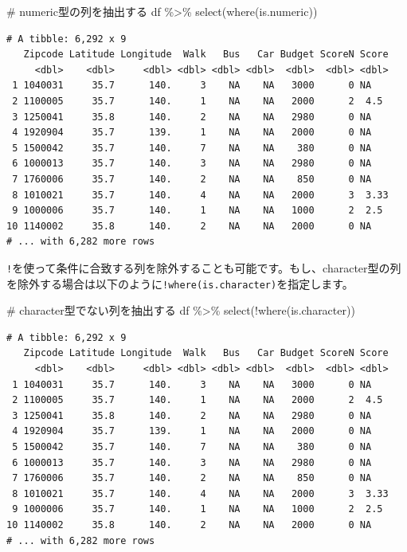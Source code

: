 \documentclass[
  a4paper,
  pandoc,
  ja=standard,
  jafont=haranoaji]{bxjsbook}
\newenvironment{Shaded}{\begin{snugshade}}{\end{snugshade}}
\newcommand{\CommentTok}[1]{\textcolor[rgb]{0.37,0.37,0.37}{#1}}
\newcommand{\FunctionTok}[1]{\textcolor[rgb]{0.28,0.35,0.67}{#1}}
\newcommand{\NormalTok}[1]{\textcolor[rgb]{0.00,0.48,0.65}{#1}}
\newcommand{\SpecialCharTok}[1]{\textcolor[rgb]{0.37,0.37,0.37}{#1}}
\begin{document}
\begin{Shaded}
\begin{Highlighting}[numbers=left,,]
\CommentTok{\# numeric型の列を抽出する}
\NormalTok{df }\SpecialCharTok{\%\textgreater{}\%}
  \FunctionTok{select}\NormalTok{(}\FunctionTok{where}\NormalTok{(is.numeric))}
\end{Highlighting}
\end{Shaded}

\begin{verbatim}
# A tibble: 6,292 x 9
   Zipcode Latitude Longitude  Walk   Bus   Car Budget ScoreN Score
     <dbl>    <dbl>     <dbl> <dbl> <dbl> <dbl>  <dbl>  <dbl> <dbl>
 1 1040031     35.7      140.     3    NA    NA   3000      0 NA   
 2 1100005     35.7      140.     1    NA    NA   2000      2  4.5 
 3 1250041     35.8      140.     2    NA    NA   2980      0 NA   
 4 1920904     35.7      139.     1    NA    NA   2000      0 NA   
 5 1500042     35.7      140.     7    NA    NA    380      0 NA   
 6 1000013     35.7      140.     3    NA    NA   2980      0 NA   
 7 1760006     35.7      140.     2    NA    NA    850      0 NA   
 8 1010021     35.7      140.     4    NA    NA   2000      3  3.33
 9 1000006     35.7      140.     1    NA    NA   1000      2  2.5 
10 1140002     35.8      140.     2    NA    NA   2000      0 NA   
# ... with 6,282 more rows
\end{verbatim}

\texttt{!}を使って条件に合致する列を除外することも可能です。もし、character型の列を除外する場合は以下のように\texttt{!where(is.character)}を指定します。

\begin{Shaded}
\begin{Highlighting}[numbers=left,,]
\CommentTok{\# character型でない列を抽出する}
\NormalTok{df }\SpecialCharTok{\%\textgreater{}\%}
  \FunctionTok{select}\NormalTok{(}\SpecialCharTok{!}\FunctionTok{where}\NormalTok{(is.character))}
\end{Highlighting}
\end{Shaded}

\begin{verbatim}
# A tibble: 6,292 x 9
   Zipcode Latitude Longitude  Walk   Bus   Car Budget ScoreN Score
     <dbl>    <dbl>     <dbl> <dbl> <dbl> <dbl>  <dbl>  <dbl> <dbl>
 1 1040031     35.7      140.     3    NA    NA   3000      0 NA   
 2 1100005     35.7      140.     1    NA    NA   2000      2  4.5 
 3 1250041     35.8      140.     2    NA    NA   2980      0 NA   
 4 1920904     35.7      139.     1    NA    NA   2000      0 NA   
 5 1500042     35.7      140.     7    NA    NA    380      0 NA   
 6 1000013     35.7      140.     3    NA    NA   2980      0 NA   
 7 1760006     35.7      140.     2    NA    NA    850      0 NA   
 8 1010021     35.7      140.     4    NA    NA   2000      3  3.33
 9 1000006     35.7      140.     1    NA    NA   1000      2  2.5 
10 1140002     35.8      140.     2    NA    NA   2000      0 NA   
# ... with 6,282 more rows
\end{verbatim}
\end{document}
